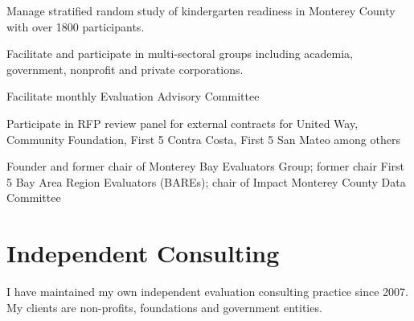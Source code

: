 \documentclass[11pt, a4paper]{awesome-cv}
\begin{document}
\begin{cventries}
{\begin{cvitems}
\item Manage stratified random study of kindergarten readiness in Monterey County with over 1800 participants.
\item Facilitate and participate in multi-sectoral groups including academia, government, nonprofit and private corporations.
\item Facilitate monthly Evaluation Advisory Committee
\item Participate in RFP review panel for external contracts for United Way, Community Foundation, First 5 Contra Costa, First 5 San Mateo among others
\item Founder and former chair of Monterey Bay Evaluators Group; former chair First 5 Bay Area Region Evaluators (BAREs);  chair of Impact Monterey County Data Committee
\end{cvitems}}
\end{cventries}

\hypertarget{independent-consulting}{%
\section{Independent Consulting}\label{independent-consulting}}

\footnotesize

I have maintained my own independent evaluation consulting practice
since 2007. My clients are non-profits, foundations and government
entities.

\begin{cvhonors}
\end{cvhonors}
\end{document}
